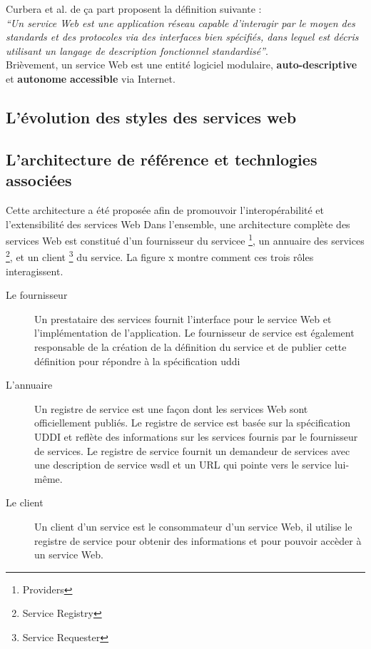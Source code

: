 
  Curbera et al. \cite{curbera2001web} de ça part proposent la
  définition suivante :\\
  \emph{``Un service Web est une application réseau capable
    d'interagir par le moyen des standards et des protocoles via des
    interfaces bien spécifiés, dans lequel est décris utilisant un
    langage de description fonctionnel standardisé''}.\\

  Brièvement, un service Web est une entité logiciel modulaire,
  \textbf{auto-descriptive} et \textbf{autonome} \textbf{accessible}
  via Internet.

  \subsection{L'évolution des styles des services web}
  \label{sec:levol-des-styl}
  

  \newpage
  \subsection{L'architecture de référence et technlogies associées}
  \label{sec:reference-arch}
  Cette architecture a été proposée afin de promouvoir
  l'interopérabilité et l'extensibilité des services Web Dans
  l'ensemble, une architecture complète des services Web est constitué
  d'un fournisseur du servicee \footnote{Providers}, un annuaire des
  services \footnote{Service Registry}, et un client \footnote{Service
    Requester} du service.  La figure x montre comment ces trois rôles
  interagissent.

  \SpecialItem
  \begin{description}
    \item[Le fournisseur] Un prestataire des services fournit
      l'interface pour le service Web et l'implémentation de
      l'application. Le fournisseur de service est également responsable
      de la création de la définition du service et de publier cette
      définition pour répondre à la spécification \acrshort{uddi}
  
    \item[L'annuaire] Un registre de service est une façon dont les
      services Web sont officiellement publiés. Le registre de service
      est basée sur la spécification \textsc{UDDI} et reflète des
      informations sur les services fournis par le fournisseur de
      services. Le registre de service fournit un demandeur de
      services avec une description de service \acrshort{wsdl} et un
      \textsc{URL} qui pointe vers le service lui-même.
  
    \item[Le client] Un client d'un service est le consommateur d'un
      service Web, il utilise le registre de service pour obtenir des
      informations et pour pouvoir accèder à un service Web.
  \end{description}

